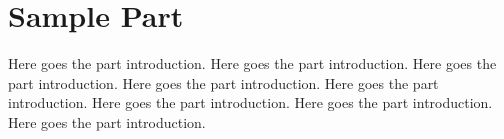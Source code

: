 \chapter{Sample Part}

Here goes the part introduction.
Here goes the part introduction.
Here goes the part introduction.
Here goes the part introduction.
Here goes the part introduction.
Here goes the part introduction.
Here goes the part introduction.
Here goes the part introduction.




